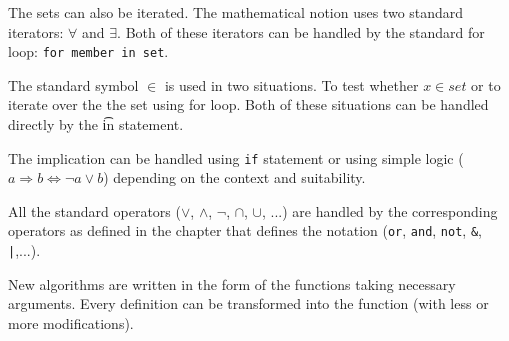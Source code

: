 \documentclass[11pt,oneside]{fithesis2}
\newcommand{\T}[1]{\texttt{#1}}
\begin{document}
The sets can also be iterated. The mathematical notion uses two standard iterators: $\forall$ and $\exists$. Both of these iterators can be handled by the standard for loop: \T{for member in set}.

The standard symbol $\in$ is used in two situations. To test whether $x \in set$ or to iterate over the the set using for loop. Both of these situations can be handled directly by the \t{in} statement.

The implication can be handled using \T{if} statement or using simple logic ($a \Rightarrow b \Leftrightarrow \neg a \vee b$) depending on the context and suitability.

All the standard operators ($\vee$, $\wedge$, $\neg$, $\cap$, $\cup$, ...) are handled by the corresponding operators as defined in the chapter that defines the notation (\T{or}, \T{and}, \T{not}, \T{\&}, \T{|},...).

New algorithms are written in the form of the functions taking necessary arguments. Every definition can be transformed into the function (with less or more modifications).
\end{document}
